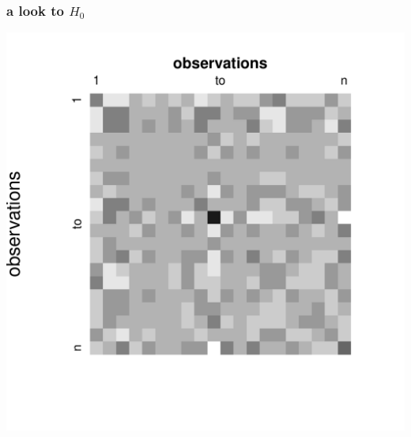 \documentclass[xcolor={pdftex,dvipsnames,table}]{beamer}
\newcommand{\bi}{\begin {itemize}}
\newcommand{\ei}{\end{itemize}}
\newcommand{\IH}{(\mathbf{I}_n-\mathbf{H})}
\begin{document}
\begin{frame}[fragile]
\frametitle{a look to $H_0$}

\includegraphics[scale=.40]{figures_perm_covariates/Preg}

\end{frame}








\end{document}

